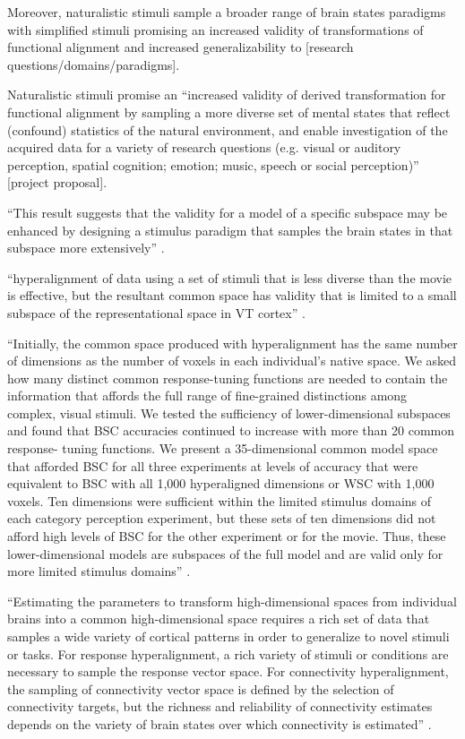 %
Moreover, naturalistic stimuli sample a broader range of brain states paradigms
with simplified stimuli \citep{guntupalli2016model, haxby2011common} promising
an increased validity of transformations of functional alignment and increased
generalizability to [research questions/domains/paradigms].

%
Naturalistic stimuli promise an ``increased validity of derived transformation
for functional alignment by sampling a more diverse set of mental states that
reflect (confound) statistics of the natural environment, and enable
investigation of the acquired data for a variety of research questions (e.g.
visual or auditory perception, spatial cognition; emotion; music, speech or
social perception)'' [project proposal].

``This result suggests that the validity for a model of a specific subspace may
be enhanced by designing a stimulus paradigm that samples the brain states in
that subspace more extensively'' \citep{haxby2011common}.

``hyperalignment of data using a set of stimuli that is less diverse than the
movie is effective, but the resultant common space has validity that is limited
to a small subspace of the representational space in VT cortex''
\citep{haxby2011common}.

``Initially, the common space produced with hyperalignment has the same number
of dimensions as the number of voxels in each individual’s native space. We
asked how many distinct common response-tuning functions are needed to contain
the information that affords the full range of fine-grained distinctions among
complex, visual stimuli. We tested the sufficiency of lower-dimensional
subspaces and found that BSC accuracies continued to increase with more than 20
common response- tuning functions. We present a 35-dimensional common model
space that afforded BSC for all three experiments at levels of accuracy that
were equivalent to BSC with all 1,000 hyperaligned dimensions or WSC with 1,000
voxels. Ten dimensions were sufficient within the limited stimulus domains of
each category perception experiment, but these sets of ten dimensions did not
afford high levels of BSC for the other experiment or for the movie. Thus, these
lower-dimensional models are subspaces of the full model and are valid only for
more limited stimulus domains'' \citep{haxby2011common}.


``Estimating the parameters to transform high-dimensional spaces from individual
brains into a common high-dimensional space requires a rich set of data that
samples a wide variety of cortical patterns in order to generalize to novel
stimuli or tasks. For response hyperalignment, a rich variety of stimuli or
conditions are necessary to sample the response vector space. For connectivity
hyperalignment, the sampling of connectivity vector space is defined by the
selection of connectivity targets, but the richness and reliability of
connectivity estimates depends on the variety of brain states over which
connectivity is estimated'' \citep{haxby2020hyperalignment}.


